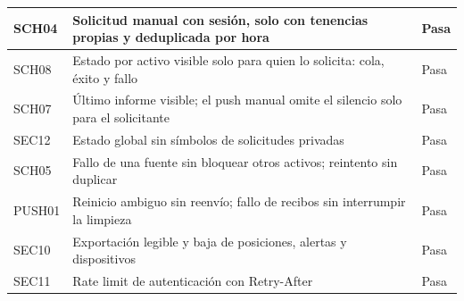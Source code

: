 \begin{longtable}{>{\raggedright\arraybackslash}p{}>{\raggedright\arraybackslash}p{}p{}}
SCH04 & Solicitud manual con sesión, solo con tenencias propias y deduplicada por hora & Pasa \\\hline
SCH08 & Estado por activo visible solo para quien lo solicita: cola, éxito y fallo & Pasa \\\hline
SCH07 & Último informe visible; el push manual omite el silencio solo para el solicitante & Pasa \\\hline
SEC12 & Estado global sin símbolos de solicitudes privadas & Pasa \\\hline
SCH05 & Fallo de una fuente sin bloquear otros activos; reintento sin duplicar & Pasa \\\hline
PUSH01 & Reinicio ambiguo sin reenvío; fallo de recibos sin interrumpir la limpieza & Pasa \\\hline
SEC10 & Exportación legible y baja de posiciones, alertas y dispositivos & Pasa \\\hline
SEC11 & Rate limit de autenticación con Retry-After & Pasa \\\hline
\end{longtable}

